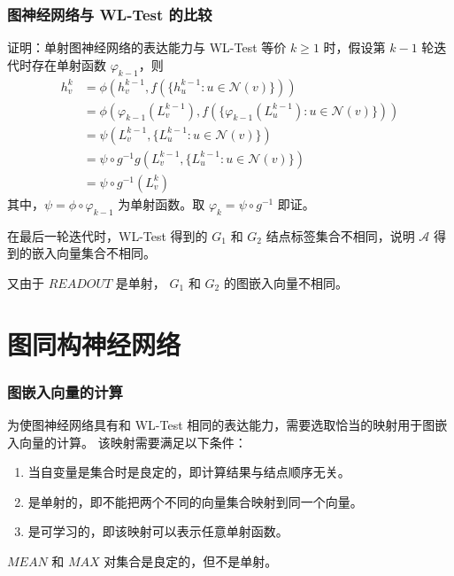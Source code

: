 \documentclass{beamer}
\begin{document}
\begin{frame}

  \frametitle{图神经网络与 WL-Test 的比较}
  \begin{block}{证明：单射图神经网络的表达能力与 WL-Test 等价}
    $k \ge 1$ 时，假设第 $k - 1$ 轮迭代时存在单射函数 $\varphi_{k-1}$，则
    \begin{align*}
      h_v^k &= \phi(h_v^{k-1}, f(\{h_u^{k-1} : u \in \mathcal{N}(v)\})) \\
            &= \phi(\varphi_{k-1}(L_v^{k-1}), f(\{\varphi_{k-1}(L_u^{k-1}) : u \in \mathcal{N}(v)\})) \\
            &= \psi(L_v^{k-1}, \{L_u^{k-1} : u \in \mathcal{N}(v)\}) \\
            &= \psi \circ g^{-1} g (L_v^{k-1}, \{L_u^{k-1} : u \in \mathcal{N}(v)\}) \\
            &= \psi \circ g^{-1}(L_v^k)
    \end{align*}
    其中，$\psi = \phi \circ \varphi_{k-1}$ 为单射函数。取 $\varphi_k = \psi \circ g^{-1}$ 即证。
    
    在最后一轮迭代时，WL-Test 得到的 $G_1$ 和 $G_2$ 结点标签集合不相同，说明 $\mathcal{A}$ 得到的嵌入向量集合不相同。
    
    又由于 $READOUT$ 是单射， $G_1$ 和 $G_2$ 的图嵌入向量不相同。
  \end{block}

\end{frame}

\section{图同构神经网络}

\begin{frame}

  \frametitle{图嵌入向量的计算}
  为使图神经网络具有和 WL-Test 相同的表达能力，需要选取恰当的映射用于图嵌入向量的计算。
  该映射需要满足以下条件：
  \begin{enumerate}
    \item 当自变量是集合时是良定的，即计算结果与结点顺序无关。
    \item 是单射的，即不能把两个不同的向量集合映射到同一个向量。
    \item 是可学习的，即该映射可以表示任意单射函数。
  \end{enumerate}
  $MEAN$ 和 $MAX$ 对集合是良定的，但不是单射。

\end{frame}
\end{document}
